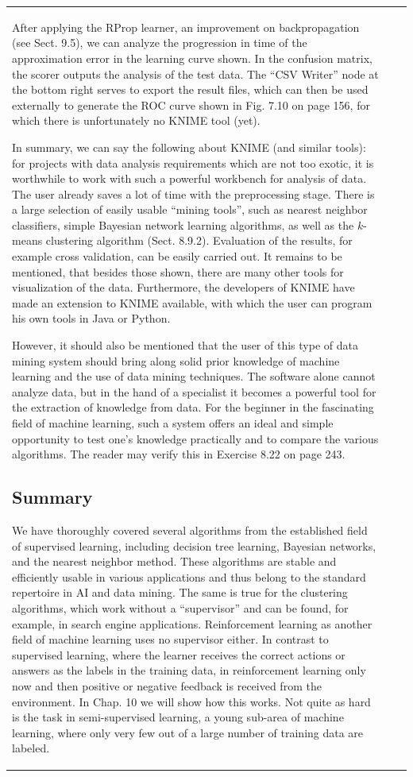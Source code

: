 \documentclass[10pt]{book}
\begin{document}
\begin{center}
\begin{tabular}{|l|l|l|}
After applying the RProp learner, an improvement on backpropagation (see Sect. 9.5), we can analyze the progression in time of the approximation error in the learning curve shown. In the confusion matrix, the scorer outputs the analysis of the test data. The ``CSV Writer'' node at the bottom right serves to export the result files, which can then be used externally to generate the ROC curve shown in Fig. 7.10 on page 156, for which there is unfortunately no KNIME tool (yet).

In summary, we can say the following about KNIME (and similar tools): for projects with data analysis requirements which are not too exotic, it is worthwhile to work with such a powerful workbench for analysis of data. The user already saves a lot of time with the preprocessing stage. There is a large selection of easily usable ``mining tools'', such as nearest neighbor classifiers, simple Bayesian network learning algorithms, as well as the $k$-means clustering algorithm (Sect. 8.9.2). Evaluation of the results, for example cross validation, can be easily carried out. It remains to be mentioned, that besides those shown, there are many other tools for visualization of the data. Furthermore, the developers of KNIME have made an extension to KNIME available, with which the user can program his own tools in Java or Python.

However, it should also be mentioned that the user of this type of data mining system should bring along solid prior knowledge of machine learning and the use of data mining techniques. The software alone cannot analyze data, but in the hand of a specialist it becomes a powerful tool for the extraction of knowledge from data. For the beginner in the fascinating field of machine learning, such a system offers an ideal and simple opportunity to test one's knowledge practically and to compare the various algorithms. The reader may verify this in Exercise 8.22 on page 243.

\subsection{Summary}
We have thoroughly covered several algorithms from the established field of supervised learning, including decision tree learning, Bayesian networks, and the nearest neighbor method. These algorithms are stable and efficiently usable in various applications and thus belong to the standard repertoire in AI and data mining. The same is true for the clustering algorithms, which work without a ``supervisor'' and can be found, for example, in search engine applications. Reinforcement learning as another field of machine learning uses no supervisor either. In contrast to supervised learning, where the learner receives the correct actions or answers as the labels in the training data, in reinforcement learning only now and then positive or negative feedback is received from the environment. In Chap. 10 we will show how this works. Not quite as hard is the task in semi-supervised learning, a young sub-area of machine learning, where only very few out of a large number of training data are labeled.


\end{tabular}
\end{center}
\end{document}
